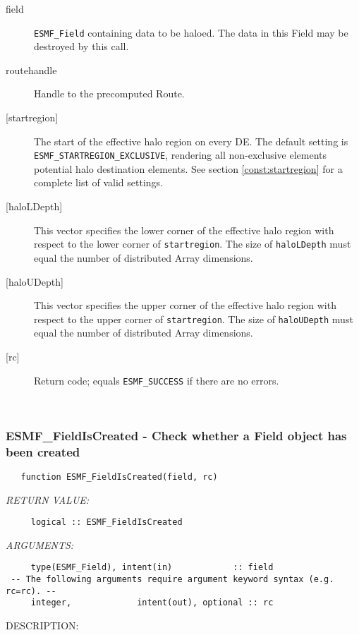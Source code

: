      \begin{description}
     \item [field]
       {\tt ESMF\_Field} containing data to be haloed. The data in this Field may be
       destroyed by this call.
     \item [routehandle]
       Handle to the precomputed Route.
     \item [{[startregion]}]
       \begin{sloppypar}
       The start of the effective halo region on every DE. The default
       setting is {\tt ESMF\_STARTREGION\_EXCLUSIVE}, rendering all non-exclusive
       elements potential halo destination elements.
       See section \ref{const:startregion} for a complete list of
       valid settings.
       \end{sloppypar}
     \item[{[haloLDepth]}] 
       This vector specifies the lower corner of the effective halo
       region with respect to the lower corner of {\tt startregion}.
       The size of {\tt haloLDepth} must equal the number of distributed Array
       dimensions.
     \item[{[haloUDepth]}] 
       This vector specifies the upper corner of the effective halo
       region with respect to the upper corner of {\tt startregion}.
       The size of {\tt haloUDepth} must equal the number of distributed Array
       dimensions.
     \item [{[rc]}]
       Return code; equals {\tt ESMF\_SUCCESS} if there are no errors.
     \end{description}
   
 
\mbox{}\hrulefill\ 
 
\subsubsection [ESMF\_FieldIsCreated] {ESMF\_FieldIsCreated - Check whether a Field object has been created}


 
\begin{verbatim}   function ESMF_FieldIsCreated(field, rc)\end{verbatim}{\em RETURN VALUE:}
\begin{verbatim}     logical :: ESMF_FieldIsCreated\end{verbatim}{\em ARGUMENTS:}
\begin{verbatim}     type(ESMF_Field), intent(in)            :: field
 -- The following arguments require argument keyword syntax (e.g. rc=rc). --
     integer,             intent(out), optional :: rc
 \end{verbatim}
{\sf DESCRIPTION:\\ }


